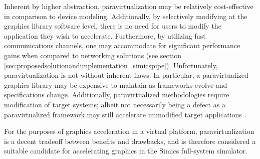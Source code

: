Inherent by higher abstraction, paravirtualization may be relatively cost-effective in comparison to device modeling.
Additionally, by selectively modifying at the graphics library software level, there is no need for users to modify the application they wish to accelerate.
Furthermore, by utilizing fast communications channels, one may accommodate for significant performance gains when compared to networking solutions (see section \ref{sec:proposedsolutionandimplementation_simicspipe}).
Unfortunately, paravirtualization is not without inherent flaws.
In particular, a paravirtualized graphics library may be expensive to maintain as frameworks evolve and specifications change.
Additionally, paravirtualized methodologies require modification of target systems; albeit not necessarily being a defect as a paravirtualized framework may still accelerate unmodified target applications .

For the purposes of graphics acceleration in a virtual platform, paravirtualization is a decent tradeoff between benefits and drawbacks, and is therefore considered a suitable candidate for accelerating graphics in the Simics full-system simulator.
